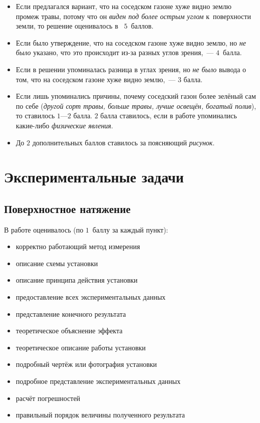 \documentclass[10pt, a4paper, oneside, fleqn]{article}
\newcommand\т{~--- }
\begin{document}
\begin{itemize}
\item Если предлагался вариант, что на соседском газоне хуже видно землю промеж травы, потому что он
\emph{виден под более острым углом} к~поверхности земли, то решение оценивалось в~ $5$~баллов.
\item Если было утверждение, что на соседском газоне хуже видно землю,
но \emph{не было} указано, что это происходит из-за разных углов зрения,\т $4$~балла.
\item Если в решении упоминалась разница в углах зрения, но \emph{не было} вывода о том,
что на соседском газоне хуже видно землю,\т $3$ балла.
\item Если лишь упоминались причины, почему соседский газон более зелёный
сам по себе (\emph{другой сорт травы, больше травы, лучше освещён, богатый полив}), то ставилось $1$---$2$ балла.
$2$ балла ставилось, если в работе упоминались какие-либо \emph{физические явления}.
\item До $2$ дополнительных баллов ставилось за поясняющий \emph{рисунок}.
\end{itemize}

\section{Экспериментальные задачи}

\subsection{Поверхностное натяжение}

В работе оценивалось (по $1$~баллу за каждый пункт):
\begin{itemize}
\item корректно работающий метод измерения
\item описание схемы установки
\item описание принципа действия установки
\item предоставление всех экспериментальных данных
\item представление конечного результата
\item теоретическое объяснение эффекта
\item теоретическое описание работы установки
\item подробный чертёж или фотография установки
\item подробное представление экспериментальных данных
\item расчёт погрешностей
\item правильный порядок величины полученного результата
\end{itemize}
\end{document}
